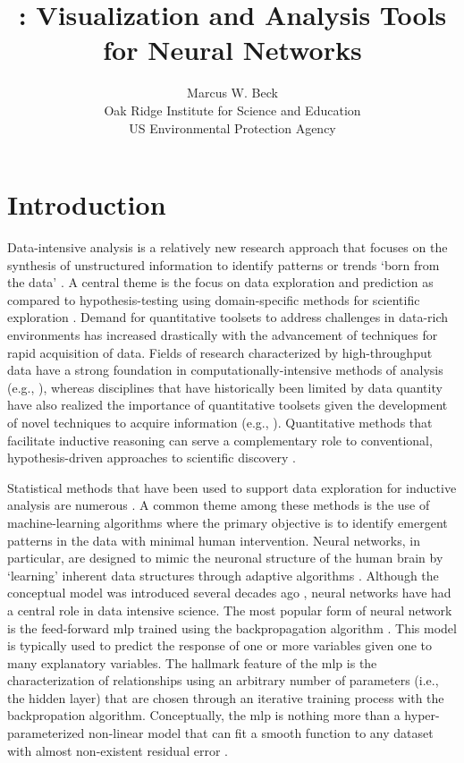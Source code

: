 \documentclass[article,shortnames]{jss}\usepackage[]{graphicx}\usepackage[]{color}
\author{Marcus W. Beck\\Oak Ridge Institute for Science and Education\\US Environmental Protection Agency}
\title{\pkg{NeuralNetTools}: Visualization and Analysis Tools for Neural Networks}
\begin{document}

\section[Introduction]{Introduction}

Data-intensive analysis is a relatively new research approach that focuses on the synthesis of unstructured information to identify patterns or trends `born from the data' \citep{Kelling09}.  A central theme is the focus on data exploration and prediction as compared to hypothesis-testing using domain-specific methods for scientific exploration \citep{Kell03}.  Demand for quantitative toolsets to address challenges in data-rich environments has increased drastically with the advancement of techniques for rapid acquisition of data. Fields of research characterized by high-throughput data have a strong foundation in computationally-intensive methods of analysis (e.g., \citet{Saeys07}), whereas disciplines that have historically been limited by data quantity have also realized the importance of quantitative toolsets given the development of novel techniques to acquire information (e.g., \citet{Swanson15}).  Quantitative methods that facilitate inductive reasoning can serve a complementary role to conventional, hypothesis-driven approaches to scientific discovery \citep{Kell03}.  

Statistical methods that have been used to support data exploration for inductive analysis are numerous \citep{Jain00}.  A common theme among these methods is the use of machine-learning algorithms where the primary objective is to identify emergent patterns in the data with minimal human intervention.  Neural networks, in particular, are designed to mimic the neuronal structure of the human brain by `learning' inherent data structures through adaptive algorithms \citep{Rumelhart86,Ripley96}.  Although the conceptual model was introduced several decades ago \citep{McCulloch43}, neural networks have had a central role in data intensive science.  The most popular form of neural network is the feed-forward \ac{mlp} trained using the backpropagation algorithm \citep{Rumelhart86}.  This model is typically used to predict the response of one or more variables given one to many explanatory variables.  The hallmark feature of the \ac{mlp} is the characterization of relationships using an arbitrary number of parameters (i.e., the hidden layer) that are chosen through an iterative training process with the backpropation algorithm.  Conceptually, the \ac{mlp} is nothing more than a hyper-parameterized non-linear model that can fit a smooth function to any dataset with almost non-existent residual error \citep{Hornik91}.
\end{document}
